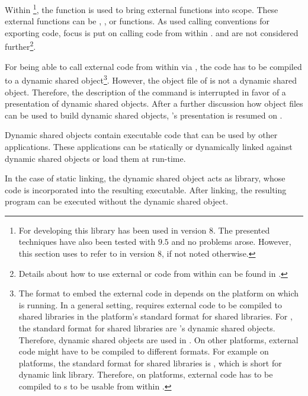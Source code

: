 Within \Maple{}\footnote{For developing this library \Maple has been used in version $8$. The presented techniques have also been tested with \Maple $9.5$ and no problems arose. However, this section uses \Maple to refer to \Maple in version $8$, if not noted otherwise.}, the function  is used to bring external functions into scope. These external functions can be \C, \Fortran, or \Java functions. As  used \C calling conventions for exporting \Aldor code, focus is put on calling \C code from within \Maple. \Fortran and \Java are not considered further\footnote{Details about how to use external \Fortran or \Java code from within \Maple can be found in \cite{Maple9AdvancedProgramming}.}. 

For being able to call external \C code from within \Maple via , the \C code has to be compiled to a dynamic shared object\footnote{The format to embed the external \C code in depends on the platform on which \Maple is running. In a general setting, \Maple requires external code to be compiled to shared libraries in the platform's standard format for shared libraries. For \GNULinux, the standard format for shared libraries are \ELF's dynamic shared objects. Therefore, dynamic shared objects are used in \LibCharSet. On other platforms, external \C code might have to be compiled to different formats. For example on \Windows platforms, the standard format for shared libraries is \DLL \cite{MSDNDLL}, which is short for dynamic link library. Therefore, on \Windows platforms, external \C code has to be compiled to \DLL{}s to be usable from within \Maple.}. However, the object file of  is not a dynamic shared object. Therefore, the description of the command  is interrupted in favor of a presentation of dynamic shared objects. After a further discussion how object files can be used to build dynamic shared objects, 's presentation is resumed on .

Dynamic shared objects contain executable code that can be used by other applications. These applications can be statically or dynamically linked against dynamic shared objects or load them at run-time.

In the case of static linking, the dynamic shared object acts as library, whose code is incorporated into the resulting executable. After linking, the resulting program can be executed without the dynamic shared object.

